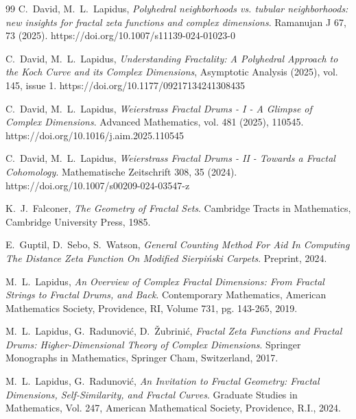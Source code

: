 \documentclass{article}
\theoremstyle{plain}
\numberwithin{equation}{section}
\numberwithin{table}{section}
\numberwithin{figure}{section}
\begin{document}
\begin{thebibliography}{99}
C.~David, M.~L.~Lapidus, \emph{Polyhedral neighborhoods vs. tubular neighborhoods: new insights for fractal zeta functions and complex dimensions}. Ramanujan J 67, 73 (2025). https://doi.org/10.1007/s11139-024-01023-0



C.~David, M.~L.~Lapidus, \emph{Understanding Fractality: A Polyhedral Approach to the Koch Curve and its Complex Dimensions}, Asymptotic Analysis (2025), vol. 145, issue 1. https://doi.org/10.1177/09217134241308435



C.~David, M.~L.~Lapidus, \emph{Weierstrass Fractal Drums - I - A Glimpse of Complex Dimensions}. Advanced Mathematics, vol. 481 (2025), 110545. \\https://doi.org/10.1016/j.aim.2025.110545



C.~David, M.~L.~Lapidus, \emph{Weierstrass Fractal Drums - II - Towards a Fractal Cohomology}. Mathematische Zeitschrift 308, 35 (2024). https://doi.org/10.1007/s00209-024-03547-z




K.~J.~Falconer, \emph{The Geometry of Fractal Sets}.
Cambridge Tracts in Mathematics, Cambridge University Press, 1985.




E.~Guptil, D.~Sebo, S.~Watson, \emph{General Counting Method For Aid In Computing The Distance Zeta Function On Modified Sierpi\'nski Carpets}.
Preprint, 2024.



M.~L.~Lapidus, \emph{An Overview of Complex Fractal Dimensions: From Fractal Strings to Fractal Drums, and Back}.
Contemporary Mathematics, American Mathematics Society, Providence, RI, Volume 731, pg. 143-265, 2019.



M.~L.~Lapidus, G.~Radunović, D.~Žubrinić, \emph{Fractal Zeta Functions and Fractal Drums: Higher-Dimensional Theory of Complex Dimensions}.
Springer Monographs in Mathematics, Springer Cham, Switzerland, 2017.
 



M.~L.~Lapidus, G.~Radunović, \emph{An Invitation to Fractal Geometry: Fractal Dimensions, Self-Similarity, and Fractal Curves}.
Graduate Studies in Mathematics, Vol. 247, American Mathematical Society, Providence, R.I., 2024.




\end{thebibliography}
\end{document}
